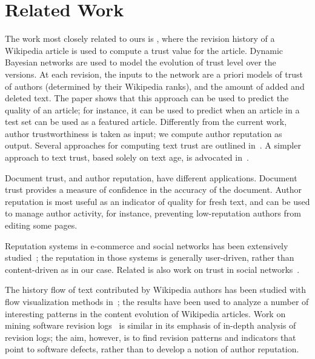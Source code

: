 \section{Related Work}

The work most closely related to ours is \cite{Zeng2006}, where the
revision history of a Wikipedia article is used to compute a trust
value for the article.
Dynamic Bayesian networks are used to model the
evolution of trust level over the versions. 
At each revision, the inputs to the network are a priori models of
trust of authors (determined by their Wikipedia ranks), 
and the amount of added and deleted text. 
The paper shows that this approach can be used to predict the quality
of an article; for instance, it can be used to predict when an article
in a test set can be used as a featured article.  
Differently from the current work, author trustworthiness is
taken as input; we compute author reputation as output. 
Several approaches for computing text trust are outlined
in~\cite{WikiMTWtrust06}. 
A simpler approach to text trust, based solely on text age, is
advocated in~\cite{Cross2006}. 

Document trust, and author reputation, have different applications. 
Document trust provides a measure of confidence in the accuracy of the
document. 
Author reputation is most useful as an indicator of quality
for fresh text, and can be used to manage author activity, for
instance, preventing low-reputation authors from editing some pages. 

Reputation systems in e-commerce and social networks has been extensively
studied~\cite{Kleinberg99,ResnickZFK00,Dellarocas2003,Kamvar2003};
the reputation in those systems is generally user-driven, rather than
content-driven as in our case. 
Related is also work on trust in social networks~\cite{Guha2004,Golbeck2005}. 

The history flow of text contributed by Wikipedia authors has
been studied with flow visualization methods in~\cite{Viegas04}; 
the results have been used to analyze a number of interesting patterns
in the content evolution of Wikipedia articles. 
Work on mining software revision logs~\cite{Livshits05}
is similar in its emphasis of in-depth analysis of revision logs; the
aim, however, is to find revision patterns and indicators that point
to software defects, rather than to develop a notion of author
reputation. 

